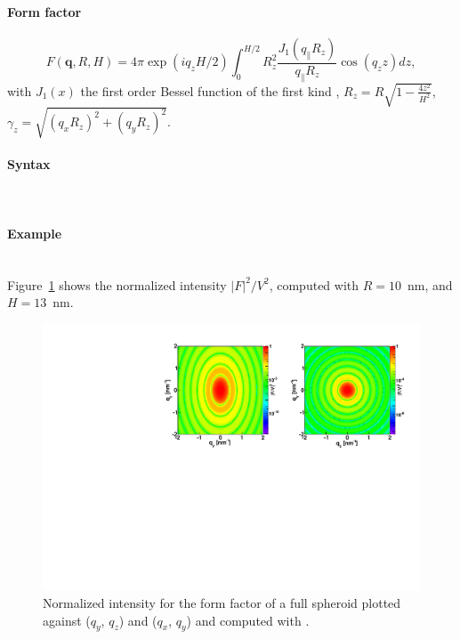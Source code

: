 \paragraph{Form factor}
\begin{equation*}
F(\mathbf{q}, R, H) = 4\pi \exp(i q_z H/2) \int_0 ^{H/2}R_z ^2
\frac{J_1(q_{\parallel}R_z)}{q_{\parallel}R_z} \cos(q_z z) dz,
\end{equation*}
with $J_1(x)$ the first order
Bessel function of the first kind \cite{AbSt64},
$R_z = R\sqrt{1-\frac{4z^2}{H^2}}$, $\gamma_z = \sqrt{(q_x R_z)^2+(q_y R_z)^2}$.

\paragraph{Syntax}\strut\\

\newpage

\paragraph{Example}\strut\\
Figure~\ref{fig:FFfspheroidEx} shows the normalized intensity
$|F|^2/V^2$, computed with $R=10$~nm, and $H=13$~nm.
\begin{figure}[ht]
\begin{center}
\includegraphics[angle=-90,width=\textwidth]{fig/ff/figfffspheroid.pdf}
\end{center}
\caption{Normalized intensity for the form factor of a full spheroid plotted against ($q_y$, $q_z$) and ($q_x$, $q_y$) and
  computed with .}
\label{fig:FFfspheroidEx}
\end{figure}

